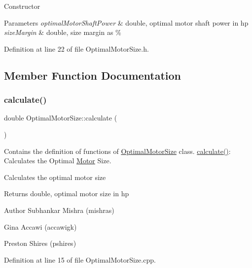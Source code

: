 Constructor 
\begin{DoxyParams}{Parameters}
{\em optimal\+Motor\+Shaft\+Power} & double, optimal motor shaft power in hp \\
\hline
{\em size\+Margin} & double, size margin as \% \\
\hline
\end{DoxyParams}


Definition at line 22 of file Optimal\+Motor\+Size.\+h.



\subsection{Member Function Documentation}
\mbox{\label{class_optimal_motor_size_aa9f4e68b9e1807d20e7738cd0789a539}} 
\subsubsection{\texorpdfstring{calculate()}{calculate()}\hspace{0.1cm}{\footnotesize\ttfamily [1/3]}}
{\footnotesize\ttfamily double Optimal\+Motor\+Size\+::calculate (\begin{DoxyParamCaption}{ }\end{DoxyParamCaption})}



Contains the definition of functions of \hyperlink{class_optimal_motor_size}{Optimal\+Motor\+Size} class. \hyperlink{class_optimal_motor_size_aa9f4e68b9e1807d20e7738cd0789a539}{calculate()}\+: Calculates the Optimal \hyperlink{struct_motor}{Motor} Size. 

Calculates the optimal motor size \begin{DoxyReturn}{Returns}
double, optimal motor size in hp
\end{DoxyReturn}
\begin{DoxyAuthor}{Author}
Subhankar Mishra (mishras) 

Gina Accawi (accawigk) 

Preston Shires (pshires) 
\end{DoxyAuthor}


Definition at line 15 of file Optimal\+Motor\+Size.\+cpp.

\mbox{\label{class_optimal_motor_size_aa9f4e68b9e1807d20e7738cd0789a539}} 
